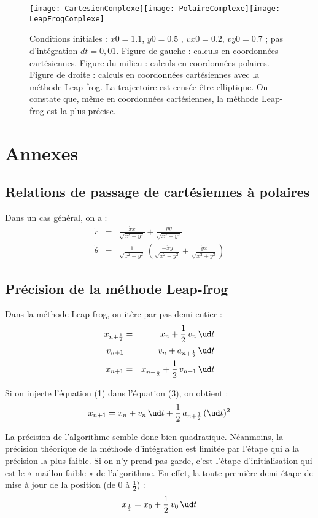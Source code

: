 \begin{figure}[htp]
 \centering
 \texttt{[image: CartesienComplexe]}\texttt{[image: PolaireComplexe]}\texttt{[image: LeapFrogComplexe]}
 \caption{Conditions initiales : $x0 = 1.1$, $y0= 0.5$ , $vx0 = 0.2$, $vy0 = 0.7$ ; pas d'intégration $dt = 0,01$. Figure de gauche : calculs en coordonnées cartésiennes. Figure du milieu : calculs en coordonnées polaires. Figure de droite : calculs en coordonnées cartésiennes avec la méthode Leap-frog. La trajectoire est censée être elliptique. On constate que, même en coordonnées cartésiennes, la méthode Leap-frog est la plus précise.}
\end{figure}

\newpage
\section*{Annexes}
\subsection*{Relations de passage de cartésiennes à polaires}

Dans un cas général, on a :
\begin{eqnarray*}
 \dot{r} &=& \frac{\dot{x}x}{\sqrt{x^2+y^2}} + \frac{\dot{y}y}{\sqrt{x^2+y^2}}\\
 \dot{\theta} &=& \frac{1}{\sqrt{x^2+y^2}}\,\left(\frac{-\dot{x}y}{\sqrt{x^2+y^2}} + \frac{\dot{y}x}{\sqrt{x^2+y^2}}\right)
\end{eqnarray*}


\subsection*{Précision de la méthode Leap-frog}
Dans la méthode Leap-frog, on itère par pas demi entier :
\begin{eqnarray}
x_{n+\frac{1}{2}} &=& x_n + \frac{1}{2}\,v_{n}\,\ud t\\
v_{n+1} &=& v_{n} + a_{n+\frac{1}{2}}\,\ud t\\
x_{n+1} &=& x_{n+\frac{1}{2}} + \frac{1}{2}\,v_{n+1}\,\ud t 
\end{eqnarray}

Si on injecte l'équation (1) dans l'équation (3), on obtient :
$$x_{n+1} = x_n + v_n\,\ud t + \frac{1}{2}\,a_{n+\frac{1}{2}}\,(\ud t)^2$$

La précision de l'algorithme semble donc bien quadratique. Néanmoins, la précision théorique de la méthode d'intégration est limitée par l'étape qui a la précision la plus faible. Si on n'y prend pas garde, c'est l'étape d'initialisation qui est le « maillon faible » de l'algorithme. En effet, la toute première demi-étape de mise à jour de la position (de 0 à $\frac{1}{2}$) : $$x_{\frac{1}{2}} = x_0 + \frac{1}{2}\,v_{0}\,\ud t$$ 


